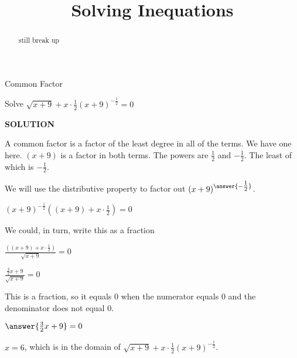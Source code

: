\documentclass{ximera}
\title{Solving Inequations}
\begin{document}
\begin{abstract}
still break up
\end{abstract}
\maketitle









\begin{example}  Common Factor


Solve $\sqrt{x+9} + x \cdot \frac{1}{2} (x+9)^{-\tfrac{1}{2}} = 0$



\textbf{\textcolor{purple!50!blue!90!black}{SOLUTION}}



A common factor is a factor of the least degree in all of the terms.  We have one here. $(x+9)$ is a factor in both terms.  The powers are $\frac{1}{2}$ and $-\frac{1}{2}$. The least of which is $-\frac{1}{2}$.

We will use the distributive property to factor out $(x+9)^{\answer{-\tfrac{1}{2}}}$.


$(x+9)^{-\tfrac{1}{2}} \left((x+9) + x \cdot \frac{1}{2}\right)  = 0$


We could, in turn, write this as a fraction


$\frac{\left((x+9) + x \cdot \frac{1}{2}\right)}{\sqrt{x+9}} = 0$


$\frac{ \frac{3}{2} x + 9}{\sqrt{x+9}} = 0$



This is a fraction, so it equals $0$ when the numerator equals $0$ and the denominator does not equal $0$.


$\answer{\frac{3}{2} x + 9} = 0$



$x = 6$, which is in the domain of $\sqrt{x+9} + x \cdot \frac{1}{2} (x+9)^{-\tfrac{1}{2}}$.

\end{example}
\end{document}
